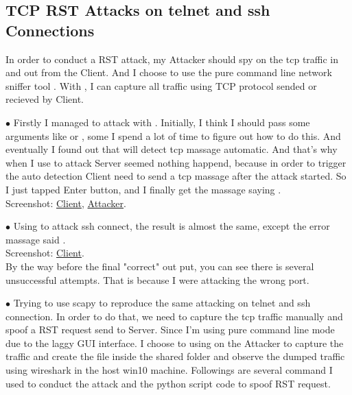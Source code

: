 \documentclass{article}
\begin{document}
\subsection{TCP RST Attacks on {\ttfamily telnet} and {\ttfamily ssh} Connections}
In order to conduct a RST attack, my Attacker should spy on the tcp traffic in and out from the Client. And I choose to use the pure command line network sniffer tool .
With , I can capture all traffic using TCP protocol sended or recieved by Client.
\begin{tlist}{3}
  \item[$\bullet$]
  Firstly I managed to attack with . Initially, I think I should pass some arguments like  or , some I spend a lot of time to figure out how to do this. And eventually I found out that  will detect tcp massage automatic. And that's why when I use  to attack Server seemed nothing happend, because in order to trigger the auto detection Client need to send a tcp massage after the attack started. So I just tapped Enter button, and I finally get the massage saying .\\
  Screenshot:
  \href{https://i.loli.net/2018/09/11/5b9751105d0b4.png}{Client},
  \href{https://i.loli.net/2018/09/11/5b9751105e414.png}{Attacker}.
  \item[$\bullet$]
  Using  to attack ssh connect, the result is almost the same, except the error massage said .\\
  Screenshot:
  \href{https://i.loli.net/2018/09/11/5b97536e44d80.png}{Client}.\\
  By the way before the final "correct" out put, you can see there is several unsuccessful attempts. That is because I were attacking the wrong port.
  \item[$\bullet$]
  Trying to use scapy to reproduce the same attacking on telnet and ssh connection. In order to do that, we need to capture the tcp traffic manually and spoof a RST request send to Server. Since I'm using pure command line mode due to the laggy GUI interface. I choose to using  on the Attacker to capture the traffic and create the  file inside the shared folder and observe the dumped traffic using wireshark in the host win10 machine. Followings are several command I used to conduct the attack and the python script code to spoof RST request.\\

\end{tlist}
\end{document}
